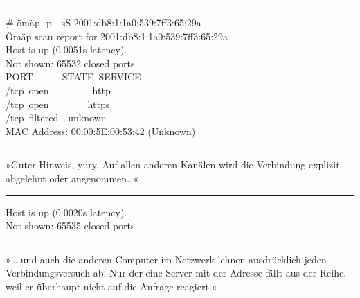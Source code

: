 \noindent \parbox{\textwidth}{ \vspace{3ex} \hrule \vspace{3ex}

    \begin{footnotesize}
    \begin{ttfamily}

\noindent \# ömäp -p- -sS 2001:db8:1:1a0:539:7ff3:65:29a\\
\noindent Ömäp scan report for 2001:db8:1:1a0:539:7ff3:65:29a\\
\noindent Host is up (0.0051s latency).\\
\noindent Not shown: 65532 closed ports\\
\noindent PORT~~~~~~STATE~SERVICE\\
/tcp~open~~~~~~~~~http\\
/tcp~open~~~~~~~~https\\
/tcp~filtered~~unknown\\
\noindent MAC Address: 00:00:5E:00:53:42 (Unknown)

    \end{ttfamily}
    \end{footnotesize}

\vspace{3ex} \hrule \vspace{3ex} }

»Guter Hinweis, yury. Auf allen anderen Kanälen wird die Verbindung explizit abgelehnt oder angenommen…«

\noindent \parbox{\textwidth}{ \vspace{3ex} \hrule \vspace{3ex}

    \begin{footnotesize}
    \begin{ttfamily}

\noindent Host is up (0.0020s latency).\\
\noindent Not shown: 65535 closed ports

    \end{ttfamily}
    \end{footnotesize}

\vspace{3ex} \hrule \vspace{3ex} }

»… und auch die anderen Computer im Netzwerk lehnen ausdrücklich jeden Verbindungsversuch ab. Nur der eine Server mit der Adresse  fällt aus der Reihe, weil er überhaupt nicht auf die Anfrage reagiert.«

